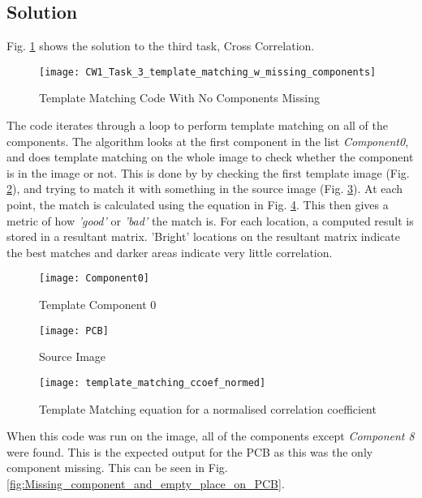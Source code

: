 \documentclass[conference]{IEEEtran}
\begin{document}
\subsection{Solution}
Fig. \ref{fig:CW1_Task_3_template_matching_w_missing_components} shows the solution to the third task, Cross Correlation.

\begin{figure}[h]
\centerline{\texttt{[image: CW1\_Task\_3\_template\_matching\_w\_missing\_components]}}
\caption{Template Matching Code With No Components Missing}
\label{fig:CW1_Task_3_template_matching_w_missing_components}
\end{figure}

The code iterates through a loop to perform template matching on all of the components. The algorithm looks at the first component in the list \textit{Component0}, and does template matching on the whole image to check whether the component is in the image or not. This is done by by checking the first template image (Fig. \ref{fig:Component0}), and trying to match it with something in the source image (Fig. \ref{fig:PCB}). At each point, the match is calculated using the equation in Fig. \ref{fig:template_matching_ccoef_normed}. This then gives a metric of how \textit{'good'} or \textit{'bad'} the match is. For each location, a computed result is stored in a resultant matrix. 'Bright' locations on the resultant matrix indicate the best matches and darker areas indicate very little correlation. \cite{ref:open_cv_templae_matching}

\begin{figure}[h]
\centerline{\texttt{[image: Component0]}}
\caption{Template Component 0}
\label{fig:Component0}
\end{figure}

\begin{figure}[h]
\centerline{\texttt{[image: PCB]}}
\caption{Source Image }
\label{fig:PCB}
\end{figure}

\begin{figure}[H]
\centerline{\texttt{[image: template\_matching\_ccoef\_normed]}}
\caption{Template Matching equation for a normalised correlation coefficient}
\label{fig:template_matching_ccoef_normed}
\end{figure}

When this code was run on the image, all of the components except \textit{Component 8} were found. This is the expected output for the PCB as this was the only component missing. This can be seen in Fig. \ref{fig:Missing_component_and_empty_place_on_PCB}.
\end{document}
